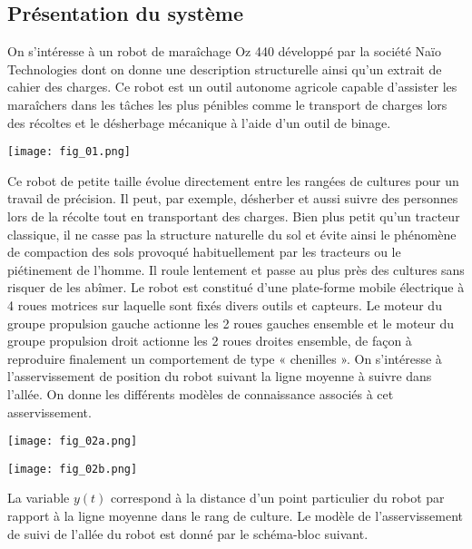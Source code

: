 \begin{multicols}{2}
\subsection*{Présentation du système}
\ifprof
\else
On s’intéresse à un robot de maraîchage Oz 440 développé par la société Naïo Technologies dont on donne une description structurelle ainsi qu’un extrait de cahier des charges. Ce robot est un outil autonome agricole capable d’assister les maraîchers dans les tâches les plus pénibles comme le transport de charges lors des récoltes et le désherbage mécanique à l’aide d’un outil de binage. 
\begin{center}
\texttt{[image: fig\_01.png]}
\end{center}

Ce robot de petite taille évolue directement entre les rangées de cultures pour un travail de précision. Il peut, par exemple, désherber et aussi suivre des personnes lors de la récolte tout en transportant des charges. Bien plus petit qu’un tracteur classique, il ne casse pas la structure naturelle du sol et évite ainsi le phénomène de compaction des sols provoqué habituellement par les tracteurs ou le piétinement de l’homme. Il roule lentement et passe au plus près des cultures sans risquer de les abîmer. Le robot est constitué d’une plate-forme mobile électrique à 4 roues motrices sur laquelle sont fixés divers outils et capteurs. Le moteur du groupe propulsion gauche actionne les 2 roues gauches ensemble et le moteur du groupe propulsion droit actionne les 2 roues droites ensemble, de façon à reproduire finalement un comportement de type « chenilles ». On s’intéresse à l’asservissement de position du robot suivant la ligne moyenne à suivre dans l’allée. On donne les différents modèles de connaissance associés à cet asservissement. 

\begin{center}
\texttt{[image: fig\_02a.png]}
\end{center}

\begin{center}
\texttt{[image: fig\_02b.png]}
\end{center}

La variable $y(t)$ correspond à la distance d’un point particulier du robot par rapport à la ligne moyenne dans le rang de culture. Le modèle de l’asservissement de suivi de l’allée du robot est donné par le schéma-bloc suivant. 


\end{multicols}
